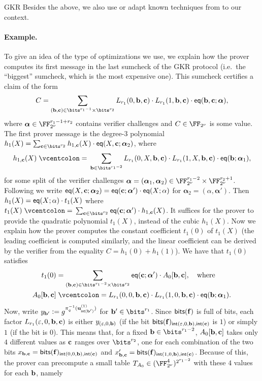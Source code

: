 \begin{lncsmove}{GKR}
 Besides the above, we also use or adapt known techniques from \cite{sumcheck_opt_1,sumcheck_opt_2,gruen} to our context.

\paragraph{Example.} To give an idea of the type of optimizations we use, we explain how the prover computes its first message in the last sumcheck of the GKR protocol (i.e.\ the ``biggest'' sumcheck, which is the most expensive one).  This sumcheck certifies a claim of the form
\[
C=\sum_{(\bb,\cc)\in \bits^{r_1-1}\times \bits^{r_2}} L_{r_1}(0,\bb,\cc)\cdot L_{r_1}(1,\bb,\cc)\cdot \eq(\bb,\cc;\bm{\alpha}),
\]
where $\bm{\alpha}\in \comfield^{r_1-1+r_2}$ contains verifier challenges and $C\in \comfield$ is some value. 
%
The first prover message is the degree-$3$ polynomial
$
h_1(X)= \sum_{\cc\in \bits^{r_2}} h_{1,\cc}(X)\cdot \eq(X,\cc;\bm{\alpha}_2)$, where  \[h_{1,\cc}(X)\defeq \sum_{\bb\in \bits^{r_1-2}} L_{r_1}(0,X,\bb,\cc)\cdot L_{r_1}(1,X,\bb,\cc)\cdot \eq(\bb;\bm{\alpha}_1),
\]
for some split of the verifier challenges $\bm{\alpha}=(\bm{\alpha}_1,\bm{\alpha}_2)\in \comfield^{r_1-2} \times \comfield^{r_2+1}$. Following \cite{gruen} we write $\mathsf{eq}(X,\mathbf{c};\bm{\alpha}_2) = \mathsf{eq}(\mathbf{c};\bm{\alpha}')\cdot \mathsf{eq}(X;\alpha)$ for  $\bm{\alpha}_2=(\alpha,\bm{\alpha}')$. Then $h_1(X)= \mathsf{eq}(X;\alpha) \cdot t_1(X)$ where $t_1(X)\defeq \sum_{\cc\in \bits^{r_2}} \eq(\cc;\bm{\alpha}') \cdot h_{1,\cc}(X)$. It suffices for the prover to provide  the quadratic polynomial $t_1(X)$, instead of the cubic $h_1(X)$. Now we explain how the prover computes the constant  coefficient $t_1(0)$ of $t_{1}(X)$ (the leading coefficient is computed similarly, and the linear coefficient can be derived by the verifier from the equality $C=h_1(0)+h_1(1)$). We have that $t_1(0)$  satisfies
\begin{equation}\label{e:t_1_0_to}
\begin{aligned}
t_1(0)&=\sum_{(\bb,\cc)\in \bits^{r_1-2}\times\bits^{r_2}} \eq(\cc;\bm{\alpha}')\cdot A_0[\bb,\cc], \quad \text{where}\\
A_0[\bb,\cc]&\defeq L_{r_1}(0,0,\bb,\cc)\cdot L_{r_1}(1,0,\bb,\cc)\cdot \eq(\bb;\bm{\alpha}_1).
\end{aligned}
\end{equation}
Now, write $y_{\mathbf{b}'}{\;\vcentcolon=\;} g^{\pi_q^{-1}(\mathbf{u}^{(1)}_{\mathsf{int}(\mathbf{b}')})}$ for $\bb'\in \bits^{r_1}$. Since $\mathsf{bits}(\mathbf{f})$ is full of bits, each factor $L_{r_1}(\varepsilon,0,\mathbf{b},\mathbf{c})$ is either $y_{(\varepsilon,0,\mathbf{b})}$ (if the bit $\mathsf{bits}(\mathbf{f})_{\mathsf{int}(\varepsilon,0,\mathbf{b}),\mathsf{int}(\mathbf{c})}$ is $1$) or simply $1$ (if the bit is $0$). This means that, for a fixed $\bb\in \bits^{r_1-2}$, $A_0[\mathbf{b},\mathbf{c}]$ takes only $4$ different values as $\mathbf{c}$ ranges over $\bits^{r_2}$, one for each combination of the two bits $x_{\mathbf{b},\mathbf{c}}=\mathsf{bits}(\mathbf{f})_{\mathsf{int}(0,0,\mathbf{b}),\mathsf{int}(\mathbf{c})}$ and $x_{\mathbf{b},\mathbf{c}}'=\mathsf{bits}(\mathbf{f})_{\mathsf{int}(1,0,\mathbf{b}),\mathsf{int}(\mathbf{c})}$. Because of this, the prover can precompute a small table $T_{A_0}\in (\comfield^{4})^{2^{r_1-2}}$ with these $4$ values for each $\mathbf{b}$, namely

\end{lncsmove}
